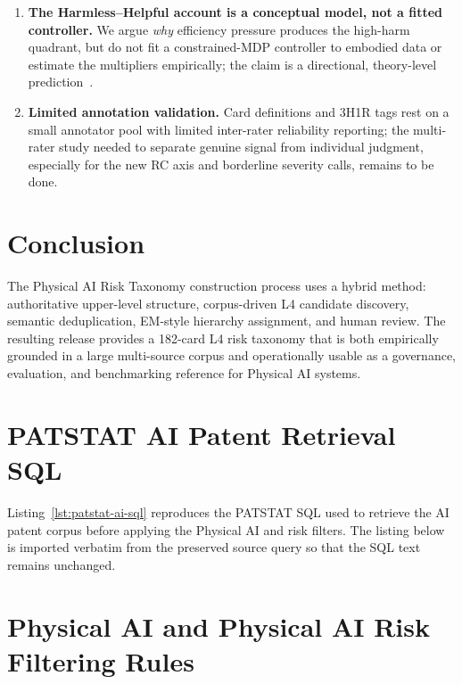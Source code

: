 \documentclass[11pt]{article}
\begin{document}
\begin{enumerate}[leftmargin=1.5em,itemsep=0.3em]
  \item \textbf{The Harmless--Helpful account is a conceptual model, not a fitted controller.} We argue \emph{why} efficiency pressure produces the high-harm quadrant, but do not fit a constrained-MDP controller to embodied data or estimate the multipliers empirically; the claim is a directional, theory-level prediction~\cite{altman1999,achiam2017}.
  \item \textbf{Limited annotation validation.} Card definitions and 3H1R tags rest on a small annotator pool with limited inter-rater reliability reporting; the multi-rater study needed to separate genuine signal from individual judgment, especially for the new RC axis and borderline severity calls, remains to be done.
\end{enumerate}

\section{Conclusion}

The Physical AI Risk Taxonomy construction process uses a hybrid method: authoritative upper-level structure, corpus-driven L4 candidate discovery, semantic deduplication, EM-style hierarchy assignment, and human review. The resulting release provides a 182-card L4 risk taxonomy that is both empirically grounded in a large multi-source corpus and operationally usable as a governance, evaluation, and benchmarking reference for Physical AI systems.

\newpage
\appendix
\section{PATSTAT AI Patent Retrieval SQL}

Listing~\ref{lst:patstat-ai-sql} reproduces the PATSTAT SQL used to retrieve the AI patent corpus before applying the Physical AI and risk filters. The listing below is imported verbatim from the preserved source query so that the SQL text remains unchanged.



\section{Physical AI and Physical AI Risk Filtering Rules}
\end{document}

